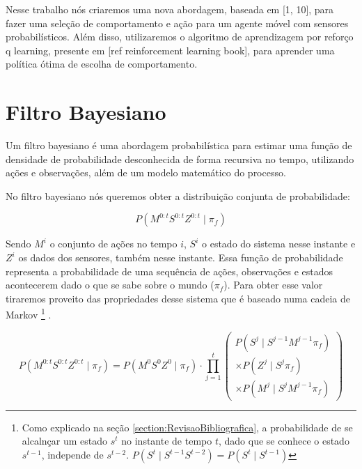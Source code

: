Nesse trabalho nós criaremos uma nova abordagem, baseada em [1, 10], para fazer uma seleção de comportamento e ação para um agente móvel com sensores probabilísticos. Além disso, utilizaremos o algoritmo de aprendizagem por reforço q learning, presente em [ref reinforcement learning book], para aprender uma política ótima de escolha de comportamento.


\section{Filtro Bayesiano}

Um filtro bayesiano é uma abordagem probabilística para estimar uma função de densidade de probabilidade desconhecida de forma recursiva no tempo, utilizando ações e observações, além de um modelo matemático do processo.

No filtro bayesiano nós queremos obter a distribuição conjunta de probabilidade:

\begin{equation}
	P ( M^{0: t} S^{0: t} Z^{0: t} \mid \pi_f )
\end{equation}

Sendo $ M^i $ o conjunto de ações no tempo $ i $, $ S^i $ o estado do sistema nesse instante e $ Z^i $ os dados dos sensores, também nesse instante. Essa função de probabilidade representa a probabilidade de uma sequência de ações, observações e estados acontecerem dado o que se sabe sobre o mundo ($ \pi_f $). Para obter esse valor tiraremos proveito das propriedades desse sistema que é baseado numa cadeia de Markov%
\footnote{Como explicado na seção \ref{section:RevisaoBibliografica}, a probabilidade de se alcalnçar um estado $ s^t $ no instante de tempo $ t $, dado que se conhece o estado $ s^{t-1} $, independe de $ s^{t-2} $. $ P(S^t\mid S^{t-1}S^{t-2})=P(S^t\mid S^{t-1}) $%
}%
.

\begin{equation}
        P ( M^{0: t} S^{0: t} Z^{0: t} \mid \pi_f ) = P ( M^0 S^0 Z^0 \mid \pi_f ) \cdot \prod\limits_{j =1}^{t} 
        \left(
            \begin{array}{l}
                P( S^j \mid S^{j -1} M^{j -1} \pi_f ) \\
                \times P( Z^j \mid S^j \pi_f ) \\
                \times P( M^j \mid S^j M^{j -1} \pi_f )
            \end{array}
        \right)
\end{equation}


